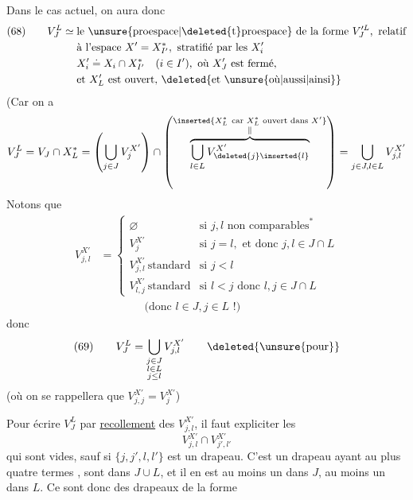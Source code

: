 
Dans le cas actuel, on aura donc
\[
\begin{aligned}
(68)\qquad V_J^L\simeq{}&\text{le \unsure{proespace|\deleted{t}proespace} de la forme }V_J^{\prime L},\text{ relatif}\\
&\text{à l'espace }X'=X_{I'}^*,\text{ stratifié par les }X_i'\\
&X_i'\doteq X_i\cap X_{I'}^*\quad(i\in I'),\text{ où }X_J'\text{ est fermé,}\\
&\text{et }X_L'\text{ est ouvert, }\deleted{\text{et }\unsure{\text{où}|\text{aussi}|\text{ainsi}}}
\end{aligned}
\]
(Car on a
\[
V_J^L=V_J\cap X_L^*
=\left(\bigcup_{j\in J}V_j^{X'}\right)\cap
\left(\overbrace{\bigcup_{l\in L}V_{\deleted{j}\inserted{l}}^{X'}}^{\substack{\inserted{X_L^*\ \text{car }X_L^*\text{ ouvert dans }X'}\\\Vert}}\right)
=\bigcup_{j\in J,l\in L}V_{j,l}^{X'}
\]
Notons que
\[
\begin{aligned}
V_{j,l}^{X'}&=
\begin{cases}
\varnothing&\text{si }j,l\text{ non comparables}^*\\
V_j^{X'}&\text{si }j=l,\text{ et donc }j,l\in J\cap L\\
V_{j,l}^{X'}\ \text{standard}&\text{si }j<l\\
V_{l,j}^{X'}\ \text{standard}&\text{si }l<j\text{ donc }l,j\in J\cap L
\end{cases}\\
&\qquad\qquad\text{(donc }l\in J,j\in L\text{ !)}
\end{aligned}
\]
donc
\[
(69)\qquad V_J^L=\bigcup_{\substack{j\in J\\l\in L\\j\leq l}}V_{j,l}^{X'}\qquad\deleted{\text{\unsure{pour}}}
\]
(où on se rappellera que $V_{j,j}^{X'}=V_j^{X'}$)


Pour écrire $V_J^L$ par \uline{recollement} des $V_{j,l}^{X'}$, il faut expliciter les
\[
V_{j,l}^{X'}\cap V_{j',l'}^{X'}
\]
qui sont vides, sauf si $\{j,j',l,l'\}$ est un drapeau. C'est un drapeau  ayant au plus quatre termes ,   sont dans $J\cup L$, et il en est au  moins un dans $J$, au moins un dans $L$. Ce sont donc des drapeaux de la forme
